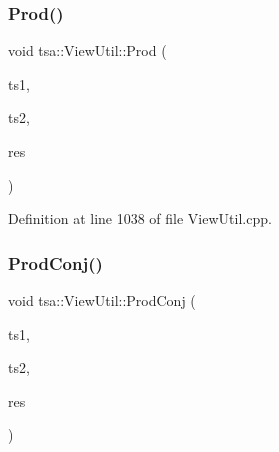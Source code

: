 \mbox{\label{classtsa_1_1_view_util_a9770830b9f778753ca53d8381e8e3d62}} 
\subsubsection{\texorpdfstring{Prod()}{Prod()}\hspace{0.1cm}{\footnotesize\ttfamily [2/2]}}
{\footnotesize\ttfamily void tsa\+::\+View\+Util\+::\+Prod (\begin{DoxyParamCaption}\item[{\hyperlink{namespacetsa_ac599574bcc094eda25613724b8f3ca9e}{Seq\+View\+Double} \&}]{ts1,  }\item[{\hyperlink{namespacetsa_ab32775c889b53c40fa83939f22372b75}{Seq\+View\+Complex} \&}]{ts2,  }\item[{\hyperlink{namespacetsa_ab32775c889b53c40fa83939f22372b75}{Seq\+View\+Complex} \&}]{res }\end{DoxyParamCaption})\hspace{0.3cm}{\ttfamily [static]}}



Definition at line 1038 of file View\+Util.\+cpp.

\mbox{\label{classtsa_1_1_view_util_aa459fc722f2de53f9c8a5fae665053fa}} 
\subsubsection{\texorpdfstring{Prod\+Conj()}{ProdConj()}}
{\footnotesize\ttfamily void tsa\+::\+View\+Util\+::\+Prod\+Conj (\begin{DoxyParamCaption}\item[{\hyperlink{namespacetsa_ab32775c889b53c40fa83939f22372b75}{Seq\+View\+Complex} \&}]{ts1,  }\item[{\hyperlink{namespacetsa_ab32775c889b53c40fa83939f22372b75}{Seq\+View\+Complex} \&}]{ts2,  }\item[{\hyperlink{namespacetsa_ab32775c889b53c40fa83939f22372b75}{Seq\+View\+Complex} \&}]{res }\end{DoxyParamCaption})\hspace{0.3cm}{\ttfamily [static]}}



